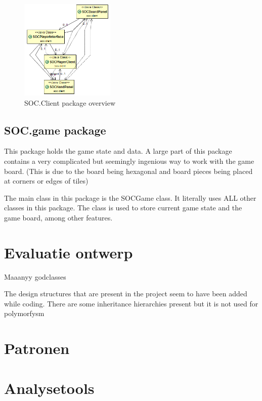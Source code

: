 \documentclass[pdftex12pt, a4paper]{article}
\begin{document}
\begin{figure}
\begin{center}
\includegraphics[width=0.4\textwidth]{Image/Ontwerp/ClientCore.png}
\caption{SOC.Client package overview}
\label{fig:empty}
\end{center}
\end{figure}

\subsection{SOC.game package}
This package holds the game state and data. 
A large part of this package contains a very complicated but seemingly ingenious way to work with the game board. 
(This is due to the board being hexagonal and board pieces being placed at corners or edges of tiles)

The main class in this package is the SOCGame class. 
It literally uses ALL other classes in this package. 
The class is used to store current game state and the game board, among other features.

\newpage

\section{Evaluatie ontwerp}

Maaanyy godclasses

The design structures that are present in the project seem to have been added while coding. 
There are some inheritance hierarchies present but it is not used for polymorfysm 

\section{Patronen}

\newpage

\section{Analysetools}
\end{document}
